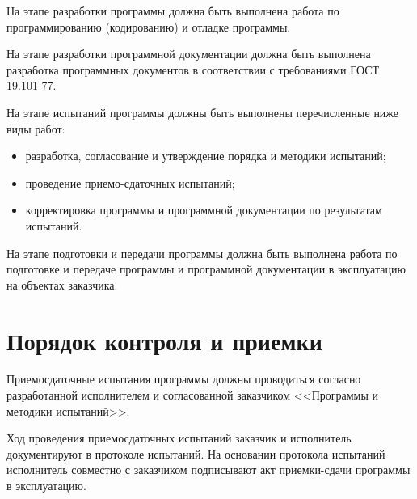 \documentclass[a4page]{article}
\begin{document}
На этапе разработки программы должна быть выполнена работа по программированию (кодированию) и отладке программы.

На этапе разработки программной документации должна быть выполнена разработка программных документов в соответствии с требованиями ГОСТ 19.101-77.

На этапе испытаний программы должны быть выполнены перечисленные ниже виды работ:

\begin{itemize}
  \item разработка, согласование и утверждение порядка и методики испытаний;
  \item проведение приемо-сдаточных испытаний;
  \item корректировка программы и программной документации по результатам испытаний.
\end{itemize}

На этапе подготовки и передачи программы должна быть выполнена работа по подготовке и передаче программы и программной документации в эксплуатацию на объектах заказчика.

\section{Порядок контроля и приемки}

Приемосдаточные испытания программы должны проводиться согласно разработанной исполнителем и согласованной заказчиком <<Программы и методики испытаний>>.

Ход проведения приемосдаточных испытаний заказчик и исполнитель документируют в протоколе испытаний.
На основании протокола испытаний исполнитель совместно с заказчиком подписывают акт приемки-сдачи программы в эксплуатацию. 
\end{document}
